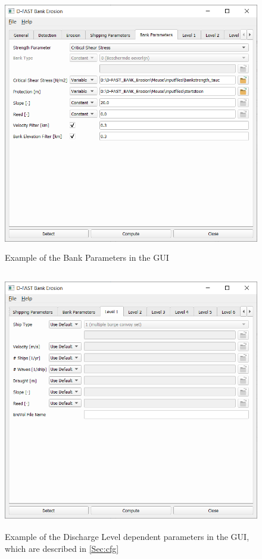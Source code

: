\begin{figure}[!hb]
\center
\includegraphics[width=\textwidth,height=11.2cm]{figures/gui5.png}
\caption{Example of the Bank Parameters in the GUI}
\vspace{-0.75cm} 
\label{guiBank}

\end{figure}

\clearpage
\begin{figure}[!ht]
\vspace{-0.75cm} 
\center
\includegraphics[width=\textwidth,height=11.4cm]{figures/gui6.png}
\caption{Example of the Discharge Level dependent parameters in the GUI, which are described in \autoref{Sec:cfg}}
\label{guiLevelX}
\vspace{-0.15cm} 
\end{figure}

